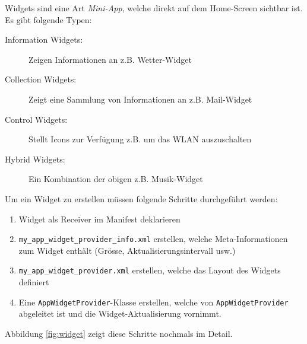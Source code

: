 Widgets sind eine Art \emph{Mini-App}, welche direkt auf dem Home-Screen sichtbar ist. Es gibt folgende Typen:
\begin{description}
	\item[Information Widgets:] Zeigen Informationen an z.B. Wetter-Widget
	\item[Collection Widgets:] Zeigt eine Sammlung von Informationen an z.B. Mail-Widget
	\item[Control Widgets:] Stellt Icons zur Verfügung z.B. um das WLAN auszuschalten
	\item[Hybrid Widgets:] Ein Kombination der obigen z.B. Musik-Widget
\end{description}
Um ein Widget zu erstellen müssen folgende Schritte durchgeführt werden:
\begin{enumerate}
	\item Widget als Receiver im Manifest deklarieren
	\item \texttt{my\_app\_widget\_provider\_info.xml} erstellen, welche Meta-Informationen zum Widget enthält (Grösse, Aktualisierungsintervall usw.)
	\item \texttt{my\_app\_widget\_provider.xml} erstellen, welche das Layout des Widgets definiert
	\item Eine \texttt{AppWidgetProvider}-Klasse erstellen, welche von \texttt{AppWidgetProvider} abgeleitet ist und die Widget-Aktualisierung vornimmt.
\end{enumerate}
Abbildung \ref{fig:widget} zeigt diese Schritte nochmals im Detail.

